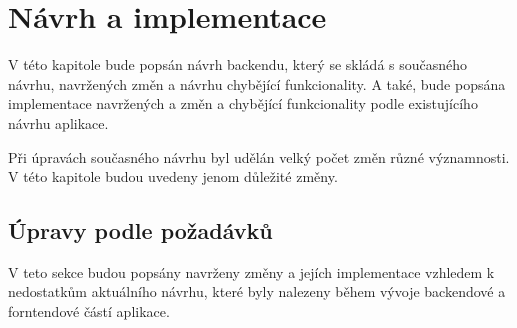 \chapter{Návrh a implementace}
V této kapitole bude popsán návrh backendu, který se skládá s současného návrhu, navržených změn a návrhu chybějící funkcionality. A také, bude popsána implementace navržených a změn a chybějící funkcionality podle existujícího návrhu aplikace.

Při úpravách současného návrhu byl udělán velký počet změn různé významnosti. V této kapitole budou uvedeny jenom důležité změny.

\section{Úpravy podle požadávků}\label{navrh:upravy}
    V teto sekce budou popsány navrženy změny a jejích implementace vzhledem k nedostatkům aktuálního návrhu, které byly nalezeny během vývoje backendové a forntendové částí aplikace. 
    
